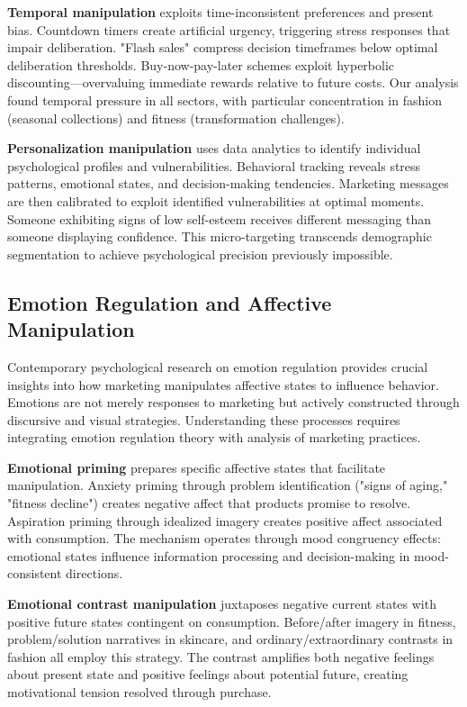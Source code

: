 \textbf{Temporal manipulation} exploits time-inconsistent preferences and present bias. Countdown timers create artificial urgency, triggering stress responses that impair deliberation. "Flash sales" compress decision timeframes below optimal deliberation thresholds. Buy-now-pay-later schemes exploit hyperbolic discounting—overvaluing immediate rewards relative to future costs. Our analysis found temporal pressure in all sectors, with particular concentration in fashion (seasonal collections) and fitness (transformation challenges).

\textbf{Personalization manipulation} uses data analytics to identify individual psychological profiles and vulnerabilities. Behavioral tracking reveals stress patterns, emotional states, and decision-making tendencies. Marketing messages are then calibrated to exploit identified vulnerabilities at optimal moments. Someone exhibiting signs of low self-esteem receives different messaging than someone displaying confidence. This micro-targeting transcends demographic segmentation to achieve psychological precision previously impossible.

\subsection{Emotion Regulation and Affective Manipulation}

Contemporary psychological research on emotion regulation provides crucial insights into how marketing manipulates affective states to influence behavior. Emotions are not merely responses to marketing but actively constructed through discursive and visual strategies. Understanding these processes requires integrating emotion regulation theory with analysis of marketing practices.

\textbf{Emotional priming} prepares specific affective states that facilitate manipulation. Anxiety priming through problem identification ("signs of aging," "fitness decline") creates negative affect that products promise to resolve. Aspiration priming through idealized imagery creates positive affect associated with consumption. The mechanism operates through mood congruency effects: emotional states influence information processing and decision-making in mood-consistent directions.

\textbf{Emotional contrast manipulation} juxtaposes negative current states with positive future states contingent on consumption. Before/after imagery in fitness, problem/solution narratives in skincare, and ordinary/extraordinary contrasts in fashion all employ this strategy. The contrast amplifies both negative feelings about present state and positive feelings about potential future, creating motivational tension resolved through purchase.

